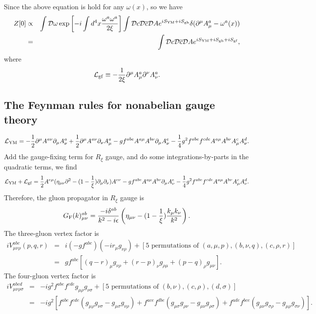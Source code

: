 Since the above equation is hold for any $\omega(x)$, so we have
\begin{eqnarray}
Z[0] &\propto& \int \mathcal{D}\omega \exp \left[-i\int d^4x \frac{\omega^a\omega^a}{2\xi} \right] \int \mathcal{D}c \mathcal{D}\overline{c} \mathcal{D}A e^{iS_{\rm YM} + iS_{\rm gh}} \delta(\partial^{\mu}A^a_{\mu}-\omega^a(x)) \nonumber \\
&=&  \int \mathcal{D}c \mathcal{D}\overline{c} \mathcal{D}A e^{iS_{\rm YM} + iS_{\rm gh} + iS_{\rm gf}} , \nonumber
\end{eqnarray}
where
\[\mathcal{L}_{\rm gf} \equiv -\frac{1}{2\xi}\partial^{\mu}A^a_{\mu} \partial^{\nu}A^a_{\nu}.\]

\subsection{The Feynman rules for nonabelian gauge theory}
\[\mathcal{L}_{\rm YM} = -\frac{1}{2}\partial^{\mu}A^{a\nu} \partial_{\mu}A^a_{\nu} + \frac{1}{2}\partial^{\mu}A^{a\nu} \partial_{\nu}A^a_{\mu} -gf^{abe}A^{a\mu}A^{b\nu}\partial_{\mu}A^e_{\nu} - \frac{1}{4}g^2 f^{abe}f^{cde}A^{a\mu}A^{b\nu}A^c_{\mu}A^d_{\nu}.\]
Add the gauge-fixing term for $R_{\xi}$ gauge, and do some integrations-by-parts in the quadratic terms, we find
\[\mathcal{L}_{\rm YM} + \mathcal{L}_{\rm gf} = \frac{1}{2}A^{e\mu}(\eta_{\mu\nu}\partial^2 -(1-\frac{1}{\xi}) \partial_{\mu}\partial_{\nu})A^{e\nu} -gf^{abe}A^{a\mu}A^{b\nu}\partial_{\mu}A^e_{\nu} - \frac{1}{4}g^2 f^{abe}f^{cde}A^{a\mu}A^{b\nu}A^c_{\mu}A^d_{\nu}.\]
Therefore, the gluon propagator in $R_{\xi}$ gauge is
\[G_{\rm F}(k)^{ab}_{\mu\nu} = \frac{-i\delta^{ab}}{k^2-i\epsilon} \left( \eta_{\mu\nu} - (1 - \frac{1}{\xi}) \frac{k_{\mu}k_{\nu}}{k^2} \right).\]
The three-gluon vertex factor is
\begin{eqnarray}
iV^{abc}_{\mu\nu\rho}(p,q,r) &=& i (-gf^{abc})(-ir_{\mu}g_{\nu\rho}) + [5 \mbox{ permutations of } (a,\mu,p),(b,\nu,q),(c,\rho,r)] \nonumber \\
&=& gf^{abc}[(q-r)_{\mu}g_{\nu\rho} + (r-p)_{\nu}g_{\rho\mu} + (p-q)_{\rho}g_{\mu\nu}] .\nonumber
\end{eqnarray}
The four-gluon vertex factor is
\begin{eqnarray}
iV^{abcd}_{\mu\nu\rho\sigma} &=& -ig^2f^{abe} f^{cde} g_{\mu\rho}g_{\nu\sigma} + [5 \mbox{ permutations of } (b,\nu),(c,\rho),(d,\sigma)] \nonumber \\
&=& -ig^2 [f^{abe}f^{cde}(g_{\mu\rho}g_{\nu\sigma} - g_{\mu\sigma}g_{\nu\rho}) + f^{ace}f^{dbe}(g_{\mu\sigma}g_{\rho\nu} - g_{\mu\nu}g_{\rho\sigma}) + f^{ade}f^{bce}(g_{\mu\nu}g_{\sigma\rho} - g_{\mu\rho}g_{\sigma\nu})] .\nonumber
\end{eqnarray}

